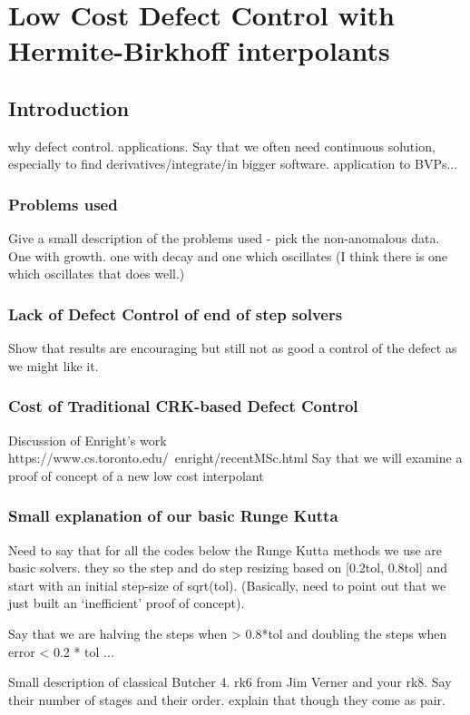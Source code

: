 \documentclass{article}
\begin{document}
\section{Low Cost Defect Control with Hermite-Birkhoff interpolants}
\subsection{Introduction}
why defect control. applications. Say that we often need continuous solution, especially to find derivatives/integrate/in bigger software. application to BVPs...

\subsubsection{Problems used}
Give a small description of the problems used - pick the non-anomalous data.
One with growth. one with decay and one which oscillates (I think there is one which oscillates that does well.)


\subsubsection{Lack of Defect Control of end of step solvers}
Show that results are encouraging but still not as good a control of the defect as we might like it.

\subsubsection{Cost of Traditional CRK-based Defect Control}
Discussion of Enright's work
https://www.cs.toronto.edu/~enright/recentMSc.html
Say that we will examine a proof of concept of a new low cost interpolant

\subsubsection{Small explanation of our basic Runge Kutta}
Need to say that for all the codes below the Runge Kutta methods we use are basic solvers. they so the step and do step resizing based on [0.2tol, 0.8tol] and start with an initial step-size of sqrt(tol). (Basically, need to point out that we just built an `inefficient' proof of concept).

Say that we are halving the steps when > 0.8*tol and doubling the steps when error < 0.2 * tol ...

Small description of classical Butcher 4. rk6 from Jim Verner and your rk8.
Say their number of stages and their order. explain that though they come as pair.
\end{document}
